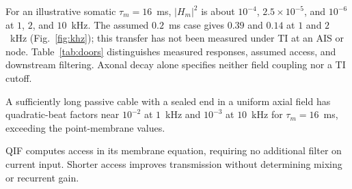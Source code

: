 For an illustrative somatic $\tau_m=16$~ms, $|H_m|^2$ is about
$10^{-4}$, $2.5\times10^{-5}$, and $10^{-6}$ at $1$, $2$, and $10$~kHz.
The assumed $0.2$~ms case gives $0.39$ and $0.14$ at $1$ and $2$~kHz
(Fig.~\ref{fig:khz}); this transfer has not been measured under TI at an
AIS or node. Table~\ref{tab:doors} distinguishes measured responses,
assumed access, and downstream filtering. Axonal decay alone specifies
neither field coupling nor a TI cutoff.

A sufficiently long passive cable with a sealed end in a uniform axial field
has quadratic-beat factors near $10^{-2}$ at $1$~kHz and $10^{-3}$ at
$10$~kHz for $\tau_m=16$~ms, exceeding the point-membrane values.

QIF computes access in its membrane equation, requiring no additional filter
on current input. Shorter access improves transmission without determining
mixing or recurrent gain.

